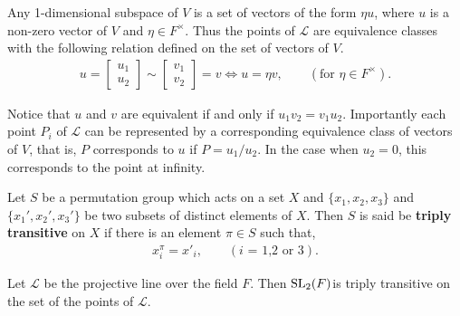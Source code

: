 Any 1-dimensional subspace of $V$ is a set of vectors of the form $\eta u$, where $u$ is a non-zero vector of $V$ and $\eta \in F^\times$. Thus the points of $\mathscr{L}$ are equivalence classes with the following relation defined on the set of vectors of $V$.
\begin{align*} u = \begin{bmatrix} u_1 \\ u_2 \end{bmatrix} \sim \begin{bmatrix} v_1 \\ v_2 \end{bmatrix} = v \iff u = \eta v, \qquad (\text{for $\eta \in F^\times$}).
\end{align*}

Notice that $u$ and $v$ are equivalent if and only if $u_1 v_2 = v_1 u_2$. Importantly each point $P_i$ of $\mathscr{L}$ can be represented by a corresponding equivalence class of vectors of $V$, that is, $P$ corresponds to $u$ if $P = u_1 / u_2$. In the case when $u_2 = 0$, this corresponds to the point at infinity.

\begin{definition} Let $S$ be a permutation group which acts on a set $X$ and $\{ x_1, x_2, x_3 \}$ and $\{ x_1', x_2', x_3' \}$ be two subsets of distinct elements of $X$. Then $S$ is said be \textbf{triply transitive} on $X$ if there is an element $\pi \in S$ such that,
\begin{align*} x^{\pi}_i = x'_i, \qquad(\text{$i$ = 1,2 or 3}).
\end{align*} 
\end{definition}

\begin{theorem} \label{6.6}
Let $\mathscr{L}$ be the projective line over the field $F$. Then $\operatorname{SL}_2(F)$is triply transitive on the set of the points of $\mathscr{L}$. \vspace{3mm}
\end{theorem}

